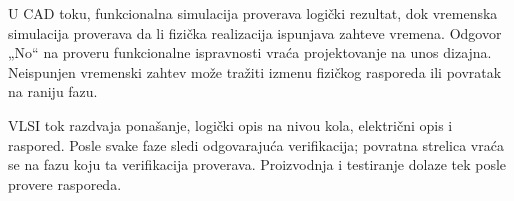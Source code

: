 U CAD toku, funkcionalna simulacija proverava logički rezultat, dok vremenska simulacija proverava da li fizička realizacija ispunjava zahteve vremena. Odgovor „No“ na proveru funkcionalne ispravnosti vraća projektovanje na unos dizajna. Neispunjen vremenski zahtev može tražiti izmenu fizičkog rasporeda ili povratak na raniju fazu.

VLSI tok razdvaja ponašanje, logički opis na nivou kola, električni opis i raspored. Posle svake faze sledi odgovarajuća verifikacija; povratna strelica vraća se na fazu koju ta verifikacija proverava. Proizvodnja i testiranje dolaze tek posle provere rasporeda.
